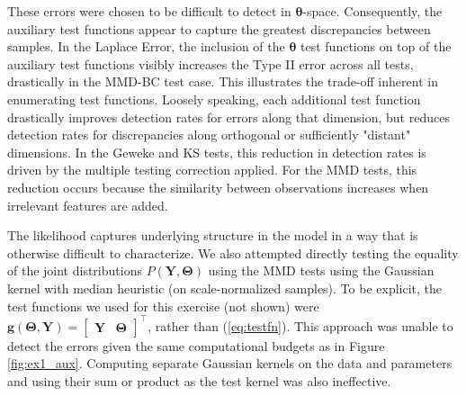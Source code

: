 \documentclass[a4paper,11pt]{article}
\begin{document}
These errors were chosen to be difficult to detect in $\mathbf{\theta}$-space. Consequently, the auxiliary test functions appear to capture the greatest discrepancies between samples. In the Laplace Error, the inclusion of the $\mathbf{\theta}$ test functions on top of the auxiliary test functions visibly increases the Type II error across all tests, drastically in the MMD-BC test case. This illustrates the trade-off inherent in enumerating test functions. Loosely speaking, each additional test function drastically improves detection rates for errors along that dimension, but reduces detection rates for discrepancies along orthogonal or sufficiently "distant" dimensions. In the Geweke and KS tests, this reduction in detection rates is driven by the multiple testing correction applied. For the MMD tests, this reduction occurs because the similarity between observations increases when irrelevant features are added.

The likelihood captures underlying structure in the model in a way that is otherwise difficult to characterize. We also attempted directly testing the equality of the joint distributions $P(\mathbf{Y}, \mathbf{\Theta})$ using the MMD tests using the Gaussian kernel with median heuristic (on scale-normalized samples). To be explicit, the test functions we used for this exercise (not shown) were $\mathbf{g}(\mathbf{\Theta}, \mathbf{Y}) = \begin{bmatrix}  \mathbf{Y}& \mathbf{\Theta} \end{bmatrix}^{\top}$, rather than (\ref{eq:testfn}). This approach was unable to detect the errors given the same computational budgets as in Figure \ref{fig:ex1_aux}. Computing separate Gaussian kernels on the data and parameters and using their sum or product as the test kernel was also ineffective.
\end{document}
